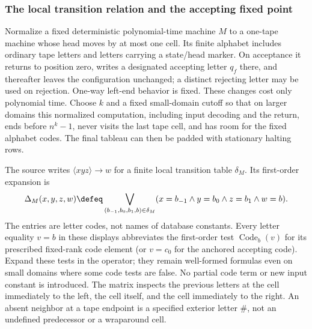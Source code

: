 \subsubsection{The local transition relation and the accepting fixed point}

Normalize a fixed deterministic polynomial-time machine \(M\) to a
one-tape machine whose head moves by at most one cell.  Its finite alphabet
includes ordinary tape letters and letters carrying a state/head marker.
On acceptance it returns to position zero, writes a designated accepting
letter \(q_f\) there, and thereafter leaves the configuration unchanged;
a distinct rejecting letter may be used on rejection.  One-way left-end
behavior is fixed.  These changes cost only polynomial time.  Choose
\(k\) and a fixed small-domain cutoff so that on larger domains this
normalized computation, including input decoding and the return, ends
before \(n^k-1\), never visits the last tape cell, and has room for
the fixed alphabet codes.  The final tableau can then be padded with
stationary halting rows.

The source writes \(\langle xyz\rangle\to w\) for a finite local
transition table \(\delta_M\).  Its first-order expansion is
\[
 \Delta_M(x,y,z,w)\defeq
 \bigvee_{(b_{-1},b_0,b_1,b)\in\delta_M}
 (x=b_{-1}\land y=b_0\land z=b_1\land w=b).
\]
The entries are letter codes, not names of database constants.  Every
letter equality \(v=b\) in these displays abbreviates the first-order
test \(\operatorname{Code}_b(v)\) for its prescribed fixed-rank code
element (or \(v=c_0\) for the anchored accepting code).  Expand
these tests in the operator; they remain well-formed formulas even on
small domains where some code tests are false.  No partial code term
or new input constant is introduced.  The
matrix inspects the previous letters at the cell immediately to the left,
the cell itself, and the cell immediately to the right.  An absent neighbor
at a tape endpoint is a specified exterior letter \(\#\), not an
undefined predecessor or a wraparound cell.

